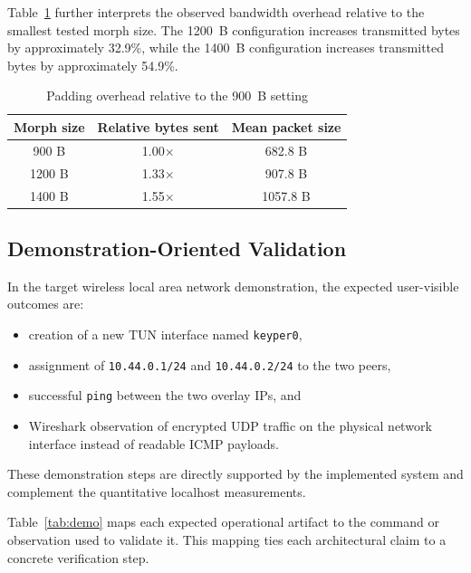 \documentclass[conference]{IEEEtran}
\begin{document}
Table~\ref{tab:comparison} further interprets the observed bandwidth overhead relative to the smallest tested morph size. The 1200~B configuration increases transmitted bytes by approximately 32.9\%, while the 1400~B configuration increases transmitted bytes by approximately 54.9\%.

\begin{table}[t]
\caption{Padding overhead relative to the 900~B setting}
\label{tab:comparison}
\centering
\begin{tabular}{c c c}
\toprule
Morph size & Relative bytes sent & Mean packet size \\
\midrule
900 B & 1.00$\times$ & 682.8 B \\
1200 B & 1.33$\times$ & 907.8 B \\
1400 B & 1.55$\times$ & 1057.8 B \\
\bottomrule
\end{tabular}
\end{table}

\subsection{Demonstration-Oriented Validation}
In the target wireless local area network demonstration, the expected user-visible outcomes are:
\begin{itemize}[leftmargin=*,itemsep=0pt,topsep=2pt]
\item creation of a new TUN interface named \texttt{keyper0},
\item assignment of \texttt{10.44.0.1/24} and \texttt{10.44.0.2/24} to the two peers,
\item successful \texttt{ping} between the two overlay IPs, and
\item Wireshark observation of encrypted UDP traffic on the physical network interface instead of readable ICMP payloads.
\end{itemize}
These demonstration steps are directly supported by the implemented system and complement the quantitative localhost measurements.

Table~\ref{tab:demo} maps each expected operational artifact to the command or observation used to validate it. This mapping ties each architectural claim to a concrete verification step.
\end{document}

